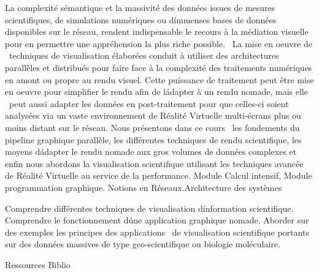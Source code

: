 \vfill

{
La complexité sémantique et la massivité des données issues de mesures scientifiques, de simulations numériques ou d\'immenses bases de données disponibles sur le réseau, rendent indispensable le recours à la médiation visuelle pour en permettre une appréhension la plus riche possible.  La mise en oeuvre de  techniques de visualisation élaborées conduit à utiliser des architectures parallèles et distribués pour faire face à la complexité des traitements numériques en amont ou propre au rendu visuel. Cette puissance de traitement peut être mise en oeuvre pour simplifier le rendu afin de l\'adapter à un rendu nomade, mais elle  peut aussi adapter les données en post-traitement pour que celles-ci soient analysées via un vaste environnement de Réalité Virtuelle multi-écrans plus ou moins distant sur le réseau.
Nous présentons dans ce cours  les fondements du pipeline graphique parallèle, les différentes techniques de rendu scientifique, les moyens d\'adapter le rendu nomade aux gros volumes de données complexes et enfin nous abordons la visualisation scientifique utilisant les techniques avancée de Réalité Virtuelle au service de la performance. 
} 
{Module Calcul intensif, Module programmation graphique. Notions en Réseaux.Architecture des systèmes} 
{\begin{itemize}
\ObjItem Comprendre différentes techniques de visualisation d\'information scientifique. Comprendre le fonctionnement d\'une application graphique nomade.
\ObjItem Aborder sur des exemples les principes des applications  de visualisation scientifique portants sur des données massives de type geo-scientifique ou biologie moléculaire.
\end{itemize} 
} 
{Ressources} 
{Biblio} 
 
